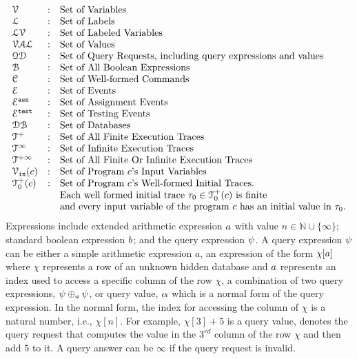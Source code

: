 \[
\begin{array}{lll}
\vardom & : & \mbox{Set of Variables} 
\\ 
\ldom & : & \mbox{Set of Labels} 
\\
\mathcal{LV} & : & \mbox{Set of Labeled Variables} 
\\
%
\valuedom & : & \mbox{Set of Values}
\\ 
\qdom & : & \mbox{Set of Query Requests, including query expressions and values} 
\\ 
\booldom & : & \mbox{{Set of All Boolean Expressions}}
%
\\
\cdom & : & \mbox{Set of Well-formed Commands} 
\\ 
%
\eventset & : & \mbox{Set of Events} 
\\
%
\eventset^{\asn} & : & \mbox{Set of Assignment Events} 
\\
%
\eventset^{\test} & : & \mbox{Set of Testing Events} 
\\
%
\dbdom & : & \mbox{{Set of Databases}} 
\\
%
{\ftdom} & : & \mbox{{Set of All Finite Execution Traces}}
\\
{\inftdom} & : & \mbox{{Set of Infinite Execution Traces}}
\\
{\tdom} & : & \mbox{{Set of All Finite Or Infinite Execution Traces}}
\\ 
%
\inpvar(c) & : & \mbox{Set of Program $c$'s Input Variables} 
\\
\ftdom_0(c) & : & \mbox{Set of Program $c$'s Well-formed Initial Traces.}
\\ & & \mbox{Each well formed initial trace $\trace_0 \in \ftdom_0(c)$ is finite}
\\ & & \mbox{and every input variable of the program $c$ has an initial value in $\trace_0$.}
\end{array}
\]
%
Expressions include extended arithmetic expression $a$ with value $n \in \mathbb{N}\cup \{\infty\}$;
standard boolean expression $b$; and the query expression $\psi$.
A query expression $\psi$ can be either a simple arithmetic expression $a$, an expression of the form $\chi[a]$ where $\chi$ represents a row of an unknown hidden database and $a$ represents an index used to access a specific column of the row $\chi$, a combination of two query expressions, $\psi \oplus_{a} \psi$, or query value, $\alpha$ which is a normal form of the query expression.
In the normal form, the index for accessing the column of $\chi$ is a natural number, i.e., $\chi[n]$.
For example, $\chi[3] + 5$ is a query value, denotes the query request that
computes
the value in the $3^{rd}$ column of the row $\chi$ and then add $5$ to it.
A query answer can be $\infty$ if the query request is invalid.

